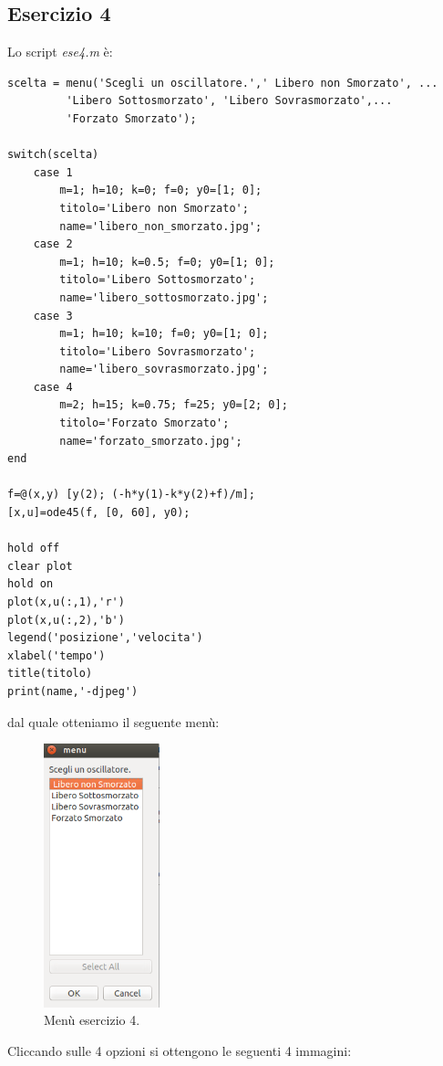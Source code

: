 \documentclass[11pt,a4paper,twoside,openright,titlepage,
headinclude,footinclude,BCOR5mm,
numbers=noenddot,cleardoublepage=empty,
tablecaptionabove]{scrbook}
\begin{document}
\subsection{Esercizio 4}
Lo script \emph{ese4.m} è:
\begin{lstlisting}[frame=trBL]
scelta = menu('Scegli un oscillatore.',' Libero non Smorzato', ...
         'Libero Sottosmorzato', 'Libero Sovrasmorzato',...
         'Forzato Smorzato');
    
switch(scelta)
    case 1
        m=1; h=10; k=0; f=0; y0=[1; 0];
        titolo='Libero non Smorzato';
        name='libero_non_smorzato.jpg';
    case 2
        m=1; h=10; k=0.5; f=0; y0=[1; 0];
        titolo='Libero Sottosmorzato';
        name='libero_sottosmorzato.jpg';
    case 3
        m=1; h=10; k=10; f=0; y0=[1; 0];
        titolo='Libero Sovrasmorzato';
        name='libero_sovrasmorzato.jpg';
    case 4
        m=2; h=15; k=0.75; f=25; y0=[2; 0];
        titolo='Forzato Smorzato';
        name='forzato_smorzato.jpg';
end
        
f=@(x,y) [y(2); (-h*y(1)-k*y(2)+f)/m];
[x,u]=ode45(f, [0, 60], y0);

hold off
clear plot
hold on
plot(x,u(:,1),'r')
plot(x,u(:,2),'b')
legend('posizione','velocita')
xlabel('tempo')
title(titolo)
print(name,'-djpeg')
\end{lstlisting}
dal quale otteniamo il seguente menù:
\begin{center}
\begin{figure}[h!]
\includegraphics[width=0.3\textwidth]{figs/menu.png}
\caption{Menù esercizio 4.}
\end{figure}
\end{center}
\newpage
Cliccando sulle 4 opzioni si ottengono le seguenti 4 immagini:
\end{document}

